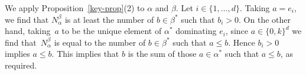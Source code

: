 We apply Proposition~\ref{key-prop}(2) to $\alpha$ and $\beta$.
Let $i \in \{1, \dots, d\}$.
Taking $a = e_i$, we find that $N^\beta_\alpha$ is at least the number of $b \in \beta^*$ such that $b_i > 0$.
On the other hand, taking~$a$ to be the unique element of $\alpha^*$ dominating $e_i$,
since $a \in \{0,k\}^d$ we find that~$N^\beta_\alpha$ is equal to the number of $b \in \beta^*$ such that $a \le b$.
Hence $b_i > 0$ implies $a \le b$.
This implies that $b$ is the sum of those $a \in \alpha^*$ such that $a \le b$, as required.
